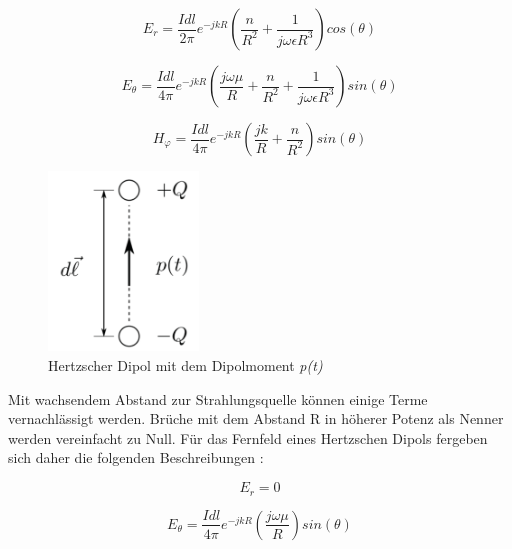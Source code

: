 



\begin{equation}
E_r= \frac{I dl}{2\pi}   e^{-jkR} \left( \frac{n}{R^{2}}  + \frac{1}{j\omega \epsilon R^{3}}\right) cos(\theta)
\end{equation}

\begin{equation}
E_\theta= \frac{I dl}{4\pi}   e^{-jkR} \left( \frac{j\omega \mu}{R}  + \frac{n}{R^{2}}+ \frac{1}{j\omega \epsilon R^{3}}\right) sin(\theta)
\end{equation}

\begin{equation}
H_\varphi= \frac{I dl}{4\pi}   e^{-jkR} \left( \frac{jk}{R}  + \frac{n}{R^{2}}\right) sin(\theta)
\end{equation}

\begin{figure}[!ht]
	\centering
	\includegraphics[width=4cm]{content/bilder/HerzDipolEMANTS37.pdf}%
	\caption{Hertzscher Dipol mit dem Dipolmoment \textit{p(t)} \cite{Emant}}
	\label{HerzDipol}
\end{figure}


Mit wachsendem Abstand zur Strahlungsquelle können einige Terme vernachlässigt werden. Brüche mit dem  Abstand R in höherer Potenz als Nenner werden vereinfacht zu Null. Für das Fernfeld eines Hertzschen Dipols fergeben sich daher die folgenden Beschreibungen \cite{elliott1981antenna}:


\begin{equation}
E_r= 0
\end{equation}

\begin{equation}
E_\theta= \frac{I dl}{4\pi}   e^{-jkR} \left( \frac{j\omega \mu}{R}  \right) sin(\theta)
\end{equation}

